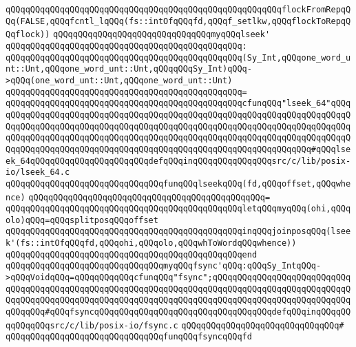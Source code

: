 \verb|qQQqqQQqqQQqqQQqqQQqqQQqqQQqqQQqqQQqqQQqqQQqqQQqqQQqqQQqflockFromRepqQQq(FALSE,qQQqfcntl_lqQQq(fs::intOfqQQqfd,qQQqf_setlkw,qQQqflockToRepqQQqflock))|\newline
\newline
\verb|qQQqqQQqqQQqqQQqqQQqqQQqqQQqqQQqmyqQQqlseek'|\newline
\verb|qQQqqQQqqQQqqQQqqQQqqQQqqQQqqQQqqQQqqQQqqQQqqQQq:|\newline
\verb|qQQqqQQqqQQqqQQqqQQqqQQqqQQqqQQqqQQqqQQqqQQqqQQq(Sy_Int,qQQqone_word_unt::Unt,qQQqone_word_unt::Unt,qQQqqQQqSy_Int)qQQq->qQQq(one_word_unt::Unt,qQQqone_word_unt::Unt)|\newline
\verb|qQQqqQQqqQQqqQQqqQQqqQQqqQQqqQQqqQQqqQQqqQQqqQQq=|\newline
\verb|qQQqqQQqqQQqqQQqqQQqqQQqqQQqqQQqqQQqqQQqqQQqqQQqcfunqQQq"lseek_64"qQQqqQQqqQQqqQQqqQQqqQQqqQQqqQQqqQQqqQQqqQQqqQQqqQQqqQQqqQQqqQQqqQQqqQQqqQQqqQQqqQQqqQQqqQQqqQQqqQQqqQQqqQQqqQQqqQQqqQQqqQQqqQQqqQQqqQQqqQQqqQQqqQQqqQQqqQQqqQQqqQQqqQQqqQQqqQQqqQQqqQQqqQQqqQQqqQQqqQQqqQQqqQQqqQQqqQQqqQQqqQQqqQQqqQQqqQQqqQQqqQQqqQQqqQQqqQQqqQQqqQQqqQQqqQQqqQQq#qQQqlseek_64qQQqqQQqqQQqqQQqqQQqqQQqdefqQQqinqQQqqQQqqQQqqQQqsrc/c/lib/posix-io/lseek_64.c|\newline
\newline
\verb|qQQqqQQqqQQqqQQqqQQqqQQqqQQqqQQqfunqQQqlseekqQQq(fd,qQQqoffset,qQQqwhence)|\newline
\verb|qQQqqQQqqQQqqQQqqQQqqQQqqQQqqQQqqQQqqQQqqQQqqQQq=|\newline
\verb|qQQqqQQqqQQqqQQqqQQqqQQqqQQqqQQqqQQqqQQqqQQqqQQqletqQQqmyqQQq(ohi,qQQqolo)qQQq=qQQqsplitposqQQqoffset|\newline
\verb|qQQqqQQqqQQqqQQqqQQqqQQqqQQqqQQqqQQqqQQqqQQqqQQqinqQQqjoinposqQQq(lseek'(fs::intOfqQQqfd,qQQqohi,qQQqolo,qQQqwhToWordqQQqwhence))|\newline
\verb|qQQqqQQqqQQqqQQqqQQqqQQqqQQqqQQqqQQqqQQqqQQqqQQqend|\newline
\newline
\verb|qQQqqQQqqQQqqQQqqQQqqQQqqQQqqQQqmyqQQqfsync'qQQq:qQQqSy_IntqQQq->qQQqVoidqQQq=qQQqqQQqqQQqcfunqQQq"fsync";qQQqqQQqqQQqqQQqqQQqqQQqqQQqqQQqqQQqqQQqqQQqqQQqqQQqqQQqqQQqqQQqqQQqqQQqqQQqqQQqqQQqqQQqqQQqqQQqqQQqqQQqqQQqqQQqqQQqqQQqqQQqqQQqqQQqqQQqqQQqqQQqqQQqqQQqqQQqqQQqqQQqqQQqqQQqqQQq#qQQqfsyncqQQqqQQqqQQqqQQqqQQqqQQqqQQqqQQqqQQqdefqQQqinqQQqqQQqqQQqqQQqsrc/c/lib/posix-io/fsync.c|\newline
\verb|qQQqqQQqqQQqqQQqqQQqqQQqqQQqqQQq#|\newline
\verb|qQQqqQQqqQQqqQQqqQQqqQQqqQQqqQQqfunqQQqfsyncqQQqfd|\newline
